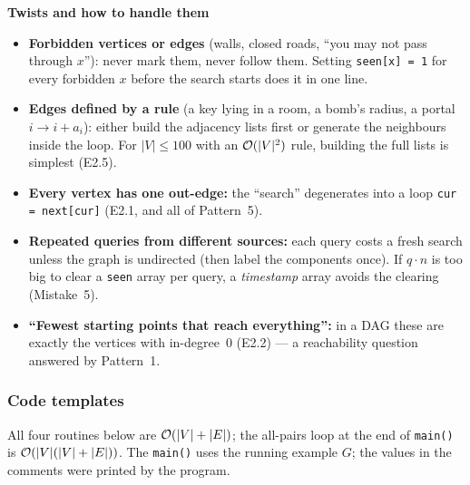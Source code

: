 \textbf{Twists and how to handle them}
\begin{itemize}[leftmargin=*]
    \item \textbf{Forbidden vertices or edges} (walls, closed roads, ``you may not pass through $x$''): never mark them, never follow them. Setting \texttt{seen[x] = 1} for every forbidden $x$ before the search starts does it in one line.
    \item \textbf{Edges defined by a rule} (a key lying in a room, a bomb's radius, a portal $i \to i + a_i$): either build the adjacency lists first or generate the neighbours inside the loop. For $|V| \le 100$ with an $\mathcal{O}(|V|^2)$ rule, building the full lists is simplest (E2.5).
    \item \textbf{Every vertex has one out-edge:} the ``search'' degenerates into a loop \texttt{cur = next[cur]} (E2.1, and all of Pattern~5).
    \item \textbf{Repeated queries from different sources:} each query costs a fresh search unless the graph is undirected (then label the components once). If $q \cdot n$ is too big to clear a \texttt{seen} array per query, a \emph{timestamp} array avoids the clearing (Mistake~5).
    \item \textbf{``Fewest starting points that reach everything'':} in a DAG these are exactly the vertices with in-degree~0 (E2.2) --- a reachability question answered by Pattern~1.
\end{itemize}

\subsubsection*{Code templates}

All four routines below are $\mathcal{O}(|V|+|E|)$; the all-pairs loop at the end of \texttt{main()} is $\mathcal{O}(|V|(|V|+|E|))$. The \texttt{main()} uses the running example $G$; the values in the comments were printed by the program.

